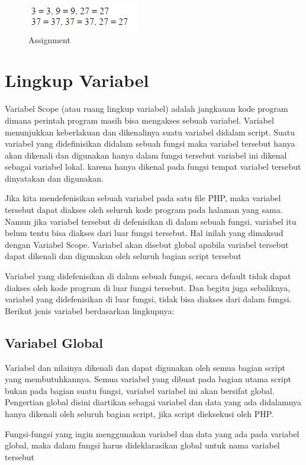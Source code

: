 \begin{figure}[h]
\centering
\includegraphics[scale=1]{figures/assignment}
\caption{Assignment}
\label{assignment}
\end{figure}

\section{Lingkup Variabel}
Variabel Scope (atau ruang lingkup variabel) adalah jangkauan kode program dimana perintah program masih bisa mengakses sebuah variabel. Variabel menunjukkan keberlakuan dan dikenalinya suatu variabel didalam script. Suatu variabel yang didefinisikan didalam sebuah fungsi maka variabel tersebut hanya akan dikenali dan digunakan hanya dalam fungsi tersebut variabel ini dikenal sebagai variabel lokal. karena hanya dikenal pada fungsi tempat variabel tersebut dinyatakan dan digunakan.

Jika kita mendefenisikan sebuah variabel pada satu file PHP, maka variabel tersebut dapat diakses oleh seluruh kode program pada halaman yang sama. Namun jika variabel tersebut di defenisikan di dalam sebuah fungsi, variabel itu belum tentu bisa diakses dari luar fungsi tersebut. Hal inilah yang dimaksud dengan Variabel Scope. Variabel akan disebut global apabila variabel tersebut dapat dikenali dan digunakan oleh seluruh bagian script tersebut

Variabel yang didefenisikan di dalam sebuah fungsi, secara default tidak dapat diakses oleh kode program di luar fungsi tersebut. Dan begitu juga sebaliknya, variabel yang didefenisikan di luar fungsi, tidak bisa diakses dari dalam fungsi. Berikut jenis variabel berdasarkan lingkupnya:

\subsection{Variabel Global}
Variabel dan nilainya dikenali dan dapat digunakan oleh semua bagian script yang membutuhkannya. Semua variabel yang dibuat pada bagian utama script bukan pada bagian suatu fungsi, variabel variabel ini akan bersifat global. Pengertian global disini diartikan sebagai variabel dan data yang ada didalamnya hanya dikenali oleh seluruh bagian script, jika script dieksekusi oleh PHP.

Fungsi-fungsi yang ingin menggunakan variabel dan data yang ada pada variabel global, maka dalam fungsi harus dideklarasikan global untuk nama variabel tersebut

